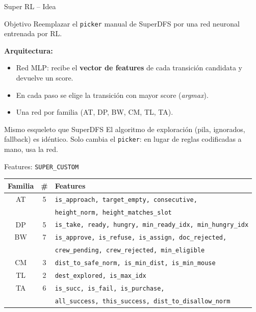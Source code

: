 \documentclass{beamer}
\begin{document}
\begin{frame}{Super RL -- Idea}

\begin{block}{Objetivo}
Reemplazar el \texttt{picker} manual de SuperDFS por una red neuronal entrenada por RL.
\end{block}

\bigskip
\textbf{Arquitectura:}
\begin{itemize}
  \item Red MLP: recibe el \textbf{vector de features} de cada transición candidata y devuelve un score.
  \item En cada paso se elige la transición con mayor score (\emph{argmax}).
  \item Una red por familia (AT, DP, BW, CM, TL, TA).
\end{itemize}

\bigskip
\begin{alertblock}{Mismo esqueleto que SuperDFS}
El algoritmo de exploración (pila, ignorados, fallback) es idéntico. Solo cambia el \texttt{picker}: en lugar de reglas codificadas a mano, usa la red.
\end{alertblock}

\end{frame}

\begin{frame}{Features: \texttt{SUPER\_CUSTOM}}

\begin{center}
\renewcommand{\arraystretch}{1.25}
\begin{tabular}{c|c|l}
\toprule
Familia & \# & Features \\
\midrule
AT & 5 & \texttt{is\_approach, target\_empty, consecutive,} \\
   &   & \texttt{height\_norm, height\_matches\_slot} \\
\midrule
DP & 5 & \texttt{is\_take, ready, hungry, min\_ready\_idx, min\_hungry\_idx} \\
\midrule
BW & 7 & \texttt{is\_approve, is\_refuse, is\_assign, doc\_rejected,} \\
   &   & \texttt{crew\_pending, crew\_rejected, min\_eligible} \\
\midrule
CM & 3 & \texttt{dist\_to\_safe\_norm, is\_min\_dist, is\_min\_mouse} \\
\midrule
TL & 2 & \texttt{dest\_explored, is\_max\_idx} \\
\midrule
TA & 6 & \texttt{is\_succ, is\_fail, is\_purchase,} \\
   &   & \texttt{all\_success, this\_success, dist\_to\_disallow\_norm} \\
\bottomrule
\end{tabular}
\end{center}

\end{frame}
\end{document}
